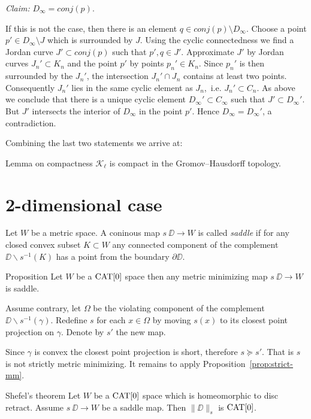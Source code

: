 \documentclass[a4paper,10pt]{amsart}
\begin{document}
{\it Claim:} $D_\infty=conj(p)$.

\noindent If this is not the case, then there is an element $q\in conj(p)\setminus D_\infty$. Choose a point $p'\in D_\infty\setminus J$ which is surrounded 
by $J$. Using the cyclic connectedness we find a Jordan curve $J'\subset conj(p)$ such that $p',q\in J'$. Approximate $J'$
by Jordan curves $J_n'\subset K_n$ and the point $p'$ by points $p_n'\in K_n$. Since $p_n'$ is then surrounded by the $J_n'$, the intersection
$J_n'\cap J_n$ contains at least two points. Consequently $J_n'$ lies in the same cyclic element as $J_n$,\ i.e. $J_n'\subset C_n$. As
above we conclude that there is a unique cyclic element $D_\infty'\subset C_\infty$ such that $J'\subset D_\infty'$. But 
$J'$ intersects the interior of $D_\infty$ in the point $p'$. Hence $D_\infty=D_\infty'$, a contradiction.
\qeds

Combining the last two statements we arrive at:

\begin{thm}{Lemma on compactness}\label{lem:compact}
$\mathcal{K}_\ell$ is compact in the Gromov--Hausdorff topology.
\end{thm}

\section{2-dimensional case}

Let $W$ be a metric space.
A coninous map $s\:\DD\to W$ is called \emph{saddle} if for any closed convex subset $K\subset W$ 
any connected component of the complement $\DD\backslash s^{-1}(K)$
has a point from the boundary $\partial \DD$.

\begin{thm}{Proposition}
Let $W$ be a $\mathop{\rm CAT}\nolimits[0]$ space then any metric minimizing map $s\:\DD\to W$ is saddle.
\end{thm}

Assume contrary, let $\Omega$ be the violating component of the complement $\DD\backslash s^{-1}(\gamma)$.
Redefine $s$ for each $x\in\Omega$ by moving 
$s(x)$ to its closest point projection on $\gamma$.
Denote by $s'$ the new map.

Since $\gamma$ is convex the closest point projection is short,
therefore $s\succcurlyeq s'$.
That is $s$ is not strictly metric minimizing.
It remains to apply Proposition~\ref{prop:strict-mm}.
\qeds


\begin{thm}{Shefel's theorem}\label{thm:shefel-2D}
Let $W$ be a $\mathop{\rm CAT}\nolimits[0]$ space which is homeomorphic to disc retract.
Assume $s\:\DD\to W$ be a saddle map. 
Then $\|\DD\|_s$ is $\mathop{\rm CAT}\nolimits[0]$.
\end{thm}
\end{document}
